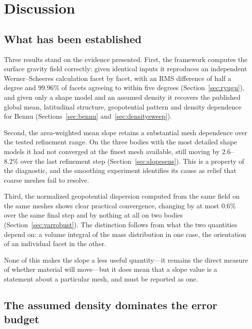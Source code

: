 \section{Discussion}
\label{sec:discussion}

\subsection{What has been established}
\label{sec:established}

Three results stand on the evidence presented. First, the framework computes
the surface gravity field correctly: given identical inputs it reproduces an
independent Werner--Scheeres calculation facet by facet, with an RMS difference
of half a degree and $99.96\%$ of facets agreeing to within five degrees
(Section~\ref{sec:ryugu}), and given only a shape model and an assumed density
it recovers the published global mean, latitudinal structure, geopotential
pattern and density dependence for Bennu (Sections~\ref{sec:bennu}
and~\ref{sec:densitysweep}).

Second, the area-weighted mean slope retains a substantial mesh dependence over
the tested refinement range. On the three bodies with the most detailed shape
models it had not converged at the finest mesh available, still moving by
$2.6$--$8.2\%$ over the last refinement step (Section~\ref{sec:slopesens}).
This is a property of the diagnostic, and the smoothing experiment identifies
its cause as relief that coarse meshes fail to resolve.

Third, the normalized geopotential dispersion computed from the same field on
the same meshes shows clear practical convergence, changing by at most $0.6\%$
over the same final step
and by nothing at all on two bodies (Section~\ref{sec:varrobust}). The
distinction follows from what the two quantities depend on: a volume integral
of the mass distribution in one case, the orientation of an individual facet in
the other.

None of this makes the slope a less useful quantity---it remains the direct
measure of whether material will move---but it does mean that a slope value is
a statement about a particular mesh, and must be reported as one.

\subsection{The assumed density dominates the error budget}
\label{sec:densitydominates}

